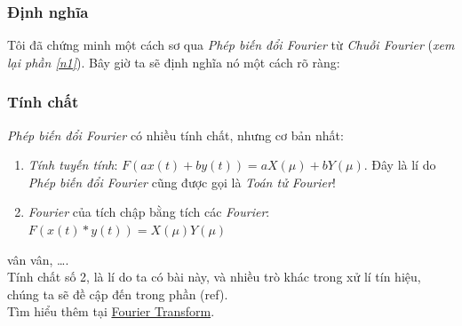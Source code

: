\documentclass{article}
\begin{document}
        \subsubsection{Định nghĩa}
        Tôi đã chứng minh một cách sơ qua \textit{Phép biến đổi Fourier} từ \textit{Chuỗi Fourier} (\textit{xem lại phần \ref{n1}}). Bây giờ ta sẽ định nghĩa nó một cách rõ ràng:\\
        \subsubsection{Tính chất}
        \label{n2}
        \textit{Phép biến đổi Fourier} có nhiều tính chất, nhưng cơ bản nhất:
        \begin{enumerate}
            \item \textit{Tính tuyến tính}: $F(ax(t)+by(t)) = aX(\mu)+bY(\mu)$. Đây là lí do \textit{Phép biến đổi Fourier} cũng được gọi là \textit{Toán tử Fourier}!
            \item \textit{Fourier} của tích chập bằng tích các \textit{Fourier}:
            $F(x(t)*y(t)) = X(\mu) Y(\mu)$
        \end{enumerate}
        vân vân, \ldots.\\Tính chất số 2, là lí do ta có bài này, và nhiều trò khác trong xử lí tín hiệu, chúng ta sẽ đề cập đến trong phần (ref).\\
        Tìm hiểu thêm tại \href{https://en.wikipedia.org/wiki/Fourier_transform}{Fourier Transform}.
\end{document}
